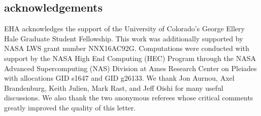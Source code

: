 \documentclass[aps, prl, twocolumn, nofootinbib, groupedaddress, amsfonts, amssymb, amsmath]{revtex4-1}
\begin{document}
\subsection{acknowledgements}
EHA acknowledges the support of the University of Colorado's George 
Ellery Hale Graduate Student Fellowship.
This work was additionally supported by  NASA LWS grant number NNX16AC92G.  
Computations were conducted 
with support by the NASA High End Computing (HEC) Program through the NASA 
Advanced Supercomputing (NAS) Division at Ames Research Center on Pleiades
with allocations GID s1647 and GID g26133.
We thank Jon Aurnou, Axel Brandenburg, Keith Julien, Mark Rast, and Jeff Oishi 
for many useful discussions. We also thank the two anonymous referees whose
critical comments greatly improved the quality of this letter.


\end{document}
